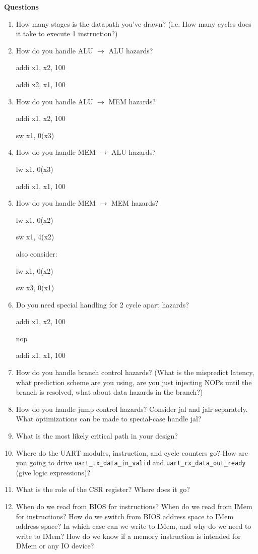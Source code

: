 \documentclass[11pt]{article}
\begin{document}
\textbf{Questions}\label{sec:chkpt1_questions}
\begin{enumerate}
\item How many stages is the datapath you've drawn? (i.e. How many cycles does it take to execute 1 instruction?)
\item How do you handle ALU $\rightarrow$ ALU hazards?

addi x1, x2, 100

addi x2, x1, 100

\item How do you handle ALU $\rightarrow$ MEM hazards?

addi x1, x2, 100

sw x1, 0(x3)

\item How do you handle MEM $\rightarrow$ ALU hazards?

lw x1, 0(x3)

addi x1, x1, 100

\item How do you handle MEM $\rightarrow$ MEM hazards?

lw x1, 0(x2)

sw x1, 4(x2)

also consider:

lw x1, 0(x2)

sw x3, 0(x1)

\item Do you need special handling for 2 cycle apart hazards?

addi x1, x2, 100

 nop

 addi x1, x1, 100

\item How do you handle branch control hazards? (What is the mispredict latency, what prediction scheme are you using, are you just injecting NOPs until the branch is resolved, what about data hazards in the branch?)
\item How do you handle jump control hazards? Consider jal and jalr separately. What optimizations can be made to special-case handle jal? 
\item What is the most likely critical path in your design?
\item Where do the UART modules, instruction, and cycle counters go? How are you going to drive \verb|uart_tx_data_in_valid| and \verb|uart_rx_data_out_ready| (give logic expressions)?
\item What is the role of the CSR register? Where does it go?
\item When do we read from BIOS for instructions? When do we read from IMem for instructions? How do we switch from BIOS address space to IMem address space? In which case can we write to IMem, and why do we need to write to IMem? How do we know if a memory instruction is intended for DMem or any IO device?
\end{enumerate}
\end{document}

